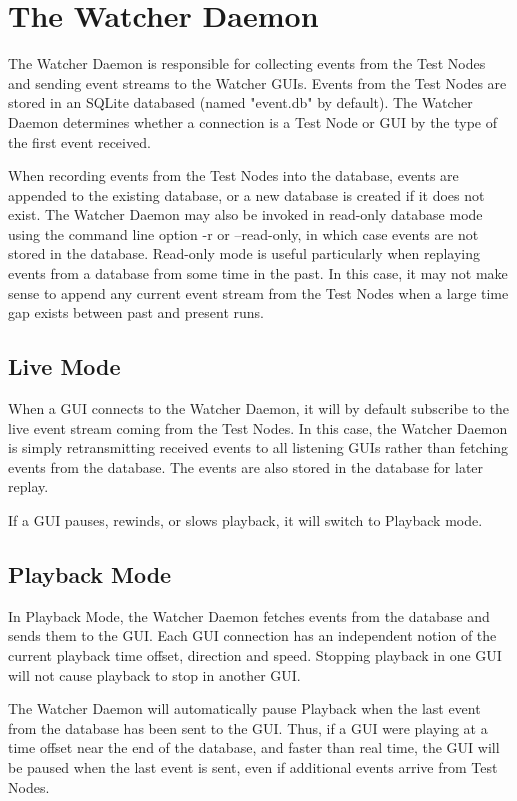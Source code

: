 \documentclass{article}
\begin{document}
\section{The Watcher Daemon}

The Watcher Daemon is responsible for collecting events from the Test Nodes and
sending event streams to the Watcher GUIs.  Events from the Test Nodes are
stored in an SQLite databased (named "event.db" by default).  The Watcher Daemon
determines whether a connection is a Test Node or GUI by the type of the first
event received.

When recording events from the Test Nodes into the database, events are
appended to the existing database, or a new database is created if it does not
exist.  The Watcher Daemon may also be invoked in read-only database mode using
the command line option -r or --read-only, in which case events are not stored
in the database.  Read-only mode is useful particularly when replaying events
from a database from some time in the past.  In this case, it may not make
sense to append any current event stream from the Test Nodes when a large time
gap exists between past and present runs.

\subsection{Live Mode}

When a GUI connects to the Watcher Daemon, it will by default subscribe to the
live event stream coming from the Test Nodes.  In this case, the Watcher Daemon
is simply retransmitting received events to all listening GUIs rather than
fetching events from the database.  The events are also stored in the database
for later replay.

If a GUI pauses, rewinds, or slows playback, it will switch to Playback mode.

\subsection{Playback Mode}

In Playback Mode, the Watcher Daemon fetches events from the database and sends
them to the GUI.  Each GUI connection has an independent notion of the current
playback time offset, direction and speed.  Stopping playback in one GUI will
not cause playback to stop in another GUI.

The Watcher Daemon will automatically pause Playback when the last event from
the database has been sent to the GUI.  Thus, if a GUI were playing at a time
offset near the end of the database, and faster than real time, the GUI will be
paused when the last event is sent, even if additional events arrive from Test
Nodes.
\end{document}
